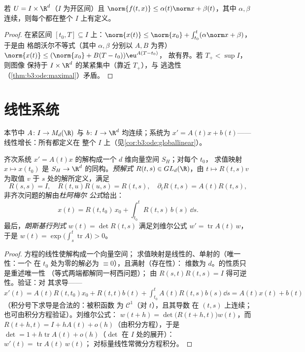\begin{corollary}[线性增长下的整体存在性]
\label{cor:b3:ode:globallinear}
若 $U = I\times\R^d$（$I$ 为开区间）且 $\norm{f(t, x)}
\leq \alpha(t)\norm x + \beta(t)$，其中 $\alpha, \beta$
连续，则每个都在整个
$I$ 上有定义。
\end{corollary}

\begin{proof}
在紧区间 $[t_0, T] \subseteq I$ 上：$\norm{x(t)} \leq
\norm{x_0} + \int_{t_0}^t(\alpha\norm x + \beta)$，于是由
格朗沃尔不等式（其中 $\alpha, \beta$ 分别以 $A, B$ 为界）
$\norm{x(t)} \leq (\norm{x_0} + B(T - t_0))\eu^{A(T - t_0)}$，
故有界。若 $T_+ < \sup I$，则图像
保持于 $I\times\R^d$ 的某紧集中（靠近 $T_+$），与
逃逸性（\cref{thm:b3:ode:maximal}）矛盾。
\end{proof}

\section{线性系统}

本节中 $A \colon I \to M_d(\R)$ 与 $b
\colon I \to \R^d$ 均连续；系统为 $x' = A(t)x
+ b(t)$——线性增长：所有都定义在
整个 $I$ 上（见\cref{cor:b3:ode:globallinear}）。

\begin{theorem}[结构]\label{thm:b3:ode:linearstructure}
齐次系统 $x' = A(t)x$ 的解构成一个
$d$ 维向量空间 $S_H$；对每个 $t_0$，
求值映射 $x \mapsto x(t_0)$ 是 $S_H \to
\R^d$ 的同构。\emph{预解式} $R(t, s) \in GL_d(\R)$，由 $t \mapsto R(t,
s)v$ 为取值 $v$ 于 $s$ 处的解所定义，满足
\[
R(s,s) = I,\quad R(t, u)R(u, s) = R(t, s),\quad
\partial_tR(t,s) = A(t)R(t,s),
\]
非齐次问题的解由\emph{杜阿梅尔
公式}给出：
\[
x(t) = R(t, t_0)\,x_0 + \int_{t_0}^{t}R(t, s)\,b(s)\,\dd s .
\]
最后，\emph{朗斯基行列式} $w(t) = \det
R(t, s)$ 满足刘维尔公式 $w' =
\operatorname{tr}A(t)\,w$，于是 $w(t) =
\exp\bigl(\int_s^t\operatorname{tr}A\bigr) > 0$。
\end{theorem}

\begin{proof}
方程的线性使解构成一个向量空间；
求值映射是线性的、单射的（唯一性：一个
在 $t_0$ 处为零的解必为 $\equiv 0$），且满射（存在性）：
维数为 $d$。的性质只是重述唯一性
（等式两端都解同一柯西问题）；
由 $R(s,t)R(t,s) = I$ 得可逆性。验证：对
其求导——$x'(t) = A(t)R(t,t_0)x_0 + R(t,t)b(t) +
\int_{t_0}^tA(t)R(t,s)b(s)\dd s = A(t)x(t) + b(t)$
（积分号下求导是合法的：被积函数
为 $\mathcal C^1$（对 $t$），且其导数
在 $(t,s)$ 上连续；也可由积分方程验证）。刘维尔公式：
$w(t + h) = \det\bigl(R(t+h, t)\bigr)w(t)$，而 $R(t + h, t) =
I + hA(t) + o(h)$（由积分方程），于是 $\det = 1
+ h\operatorname{tr}A(t) + o(h)$（$\det$ 在
$I$ 处的展开）：$w'(t) = \operatorname{tr}A(t)\,w(t)$；
对标量线性常微分方程积分。
\end{proof}

